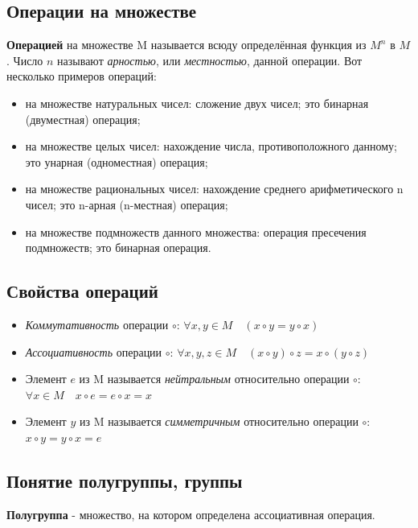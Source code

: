 \documentclass[a4paper]{article}
\begin{document}
    \newpage \begin{center}
                 \begin{Large}
                 \end{Large}
    \end{center}
    \subsection*{Операции на множестве}
    \textbf{Операцией} на множестве M называется всюду
    определённая функция из $M^n$ в $M$. Число $n$ называют \textit{арностью}, или
    \textit{местностью}, данной операции.
    Вот несколько примеров операций:
    \begin{itemize}
        \item на множестве натуральных чисел: сложение двух чисел; это бинарная
        (двуместная) операция;
        \item на множестве целых чисел: нахождение числа, противоположного
        данному; это унарная (одноместная) операция;
        \item на множестве рациональных чисел: нахождение среднего арифметического
        n чисел; это n-арная (n-местная) операция;
        \item на множестве подмножеств данного множества: операция пресечения
        подмножеств; это бинарная операция.
    \end{itemize}

    \subsection*{Свойства операций}
    \begin{itemize}
        \item \textit{Коммутативность} операции $\circ$: $\forall x, y \in M \quad (x \circ y = y \circ x)$
        \item \textit{Ассоциативность} операции $\circ$: $\forall x, y, z \in M \quad (x \circ y) \circ z = x \circ (y \circ z)$
        \item Элемент $e$ из M называется \textit{нейтральным} относительно операции $\circ$: $\forall x \in M \quad x \circ e = e \circ x = x$
        \item Элемент $y$ из M называется \textit{симметричным} относительно операции $\circ$: $x \circ y = y \circ x = e$
    \end{itemize}

    \subsection*{Понятие полугруппы, группы}
    \textbf{Полугруппа} - множество, на котором определена ассоциативная операция.
\end{document}
